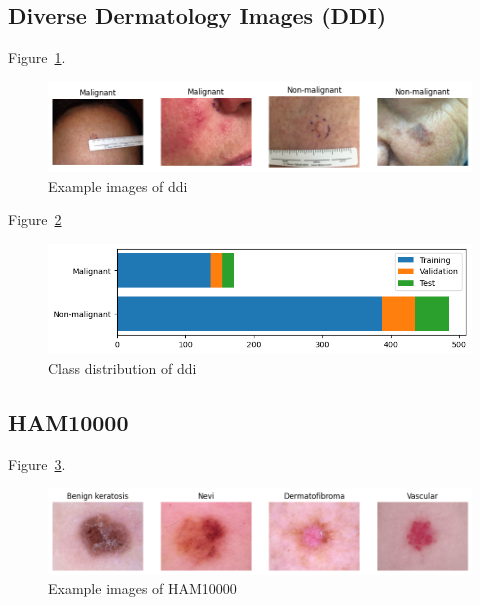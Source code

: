 \subsection{Diverse Dermatology Images (DDI)}
Figure~\ref{fig:example_images_of_ddi}.

\begin{figure}[H]
    \begin{center}
    \includegraphics[width=15cm]{../images/example_images_of_ddi.png}
    \caption{Example images of \gls{ddi}}\label{fig:example_images_of_ddi}
    \end{center}
\end{figure}

Figure~\ref{fig:class_distribution_of_ddi}

\begin{figure}[H]
    \begin{center}
    \includegraphics[width=15cm]{../images/class_distribution_of_ddi.png}
    \caption{Class distribution of \gls{ddi}}\label{fig:class_distribution_of_ddi}
    \end{center}
\end{figure}
\subsection{HAM10000}
Figure~\ref{fig:example_images_of_ham10000}.

\begin{figure}[H]
    \begin{center}
    \includegraphics[width=15cm]{../images/example_images_of_ham10000.png}
    \caption{Example images of HAM10000}\label{fig:example_images_of_ham10000}
    \end{center}
\end{figure}


